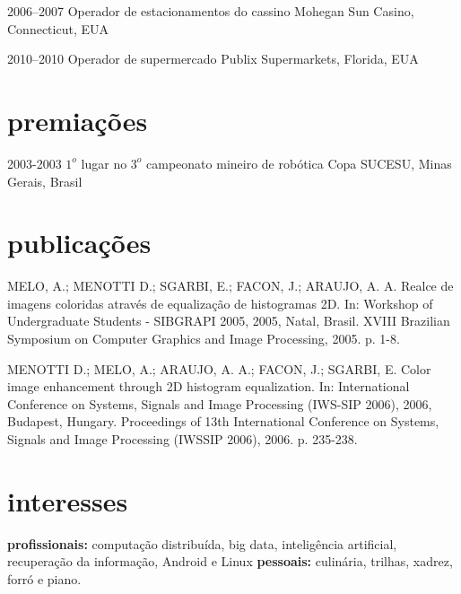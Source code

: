 \documentclass[]{friggeri-cv}
\begin{document}
\begin{entrylist}

\entry
{2006--2007}
{Operador {\normalfont de estacionamentos do cassino}}
{Mohegan Sun Casino, Connecticut, EUA}

\entry
{2010--2010} 
{Operador {\normalfont de supermercado}}
{Publix Supermarkets, Florida, EUA}

\end{entrylist}


\section{premiações}



\begin{entrylist}

\entry
{2003-2003} 
{$1^{o}$ lugar {\normalfont no $3^{o}$ campeonato mineiro de robótica}}
{Copa SUCESU, Minas Gerais, Brasil}


\end{entrylist}



\section{publicações}

MELO, A.; MENOTTI D.; SGARBI, E.; FACON, J.; ARAUJO, A. A. Realce de imagens coloridas através de equalização de histogramas 2D. In: Workshop of Undergraduate Students - SIBGRAPI 2005, 2005, Natal, Brasil. XVIII Brazilian Symposium on Computer Graphics and Image Processing, 2005. p. 1-8.

MENOTTI D.; MELO, A.; ARAUJO, A. A.; FACON, J.; SGARBI, E. Color image enhancement through 2D histogram equalization. In: International Conference on Systems, Signals and Image Processing (IWS-SIP 2006), 2006, Budapest, Hungary. Proceedings of 13th International Conference on Systems, Signals and Image Processing (IWSSIP 2006), 2006. p. 235-238.

\section{interesses}

\textbf{profissionais:} computação distribuída, big data, inteligência artificial, recuperação da informação, Android e Linux \textbf{pessoais:} culinária, trilhas,  xadrez, forró e piano.
\end{document}
